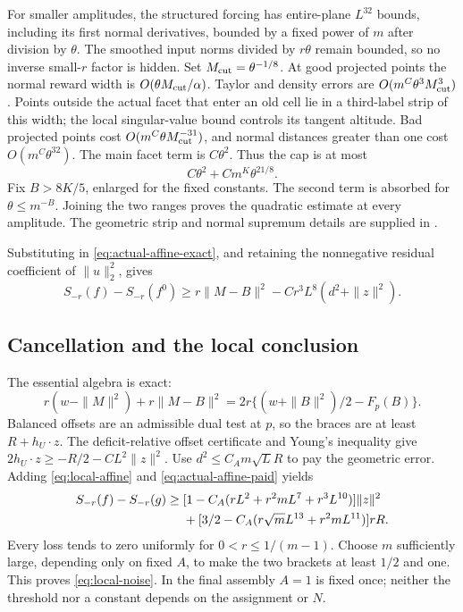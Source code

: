 For smaller amplitudes, the structured forcing has entire-plane
$L^{32}$ bounds, including its first normal derivatives, bounded by a
fixed power of $m$ after division by $\theta$. The smoothed input norms
divided by $r\theta$ remain bounded, so no inverse small-$r$ factor
is hidden. Set $M_{\rm cut}=\theta^{-1/8}$. At good projected points
the normal reward width is $O(\theta M_{\rm cut}/\alpha)$.
Taylor and density errors are $O(m^C\theta^3M_{\rm cut}^3)$.
Points outside the actual facet that enter an old cell lie in a
third-label strip of this width; the local singular-value bound controls
its tangent altitude. Bad projected points cost
$O(m^C\theta M_{\rm cut}^{-31})$, and normal distances greater than
one cost $O(m^C\theta^{32})$. The main facet term is $C\theta^2$.
Thus the cap is at most
\[
 C\theta^2+Cm^K\theta^{21/8}.
\]
Fix $B>8K/5$, enlarged for the fixed constants. The second term is
absorbed for $\theta\le m^{-B}$. Joining the two ranges proves the
quadratic estimate at every amplitude. The geometric strip and normal
supremum details are supplied in \cite{localsmallcap}.

Substituting in \eqref{eq:actual-affine-exact}, and retaining the
nonnegative residual coefficient of $\|u\|_2^2$, gives
\begin{equation}\label{eq:actual-affine-paid}
 S_{-r}(f)-S_{-r}(f^0)
       \ge r\|M-B\|^2-Cr^3L^8(d^2+\|z\|^2).
\end{equation}

\subsection{Cancellation and the local conclusion}
The essential algebra is exact:
\begin{equation}\label{eq:retained-square-cancellation}
 r(w-\|M\|^2)+r\|M-B\|^2
      =2r\{(w+\|B\|^2)/2-F_p(B)\}.
\end{equation}
Balanced offsets are an admissible dual test at $p$, so the braces
are at least $R+h_U\cdot z$. The deficit-relative offset certificate
and Young's inequality give
$2h_U\cdot z\ge-R/2-CL^2\|z\|^2$.
Use $d^2\le C_Am\sqrt L R$ to pay the geometric error. Adding
\eqref{eq:local-affine} and \eqref{eq:actual-affine-paid} yields
\begin{align}
 S_{-r}(f)-S_{-r}(g)
 \ge{}&[1-C_A(rL^2+r^2mL^7+r^3L^{10})]\|z\|^2\notag\\
 &+[3/2-C_A(r\sqrt mL^{13}+r^2mL^{11})]rR.
 \label{eq:local-final-brackets}
\end{align}
Every loss tends to zero uniformly for $0<r\le1/(m-1)$.
Choose $m$ sufficiently large, depending only on fixed $A$, to make
the two brackets at least $1/2$ and one. This proves
\eqref{eq:local-noise}. In the final assembly $A=1$ is fixed once;
neither the threshold nor a constant depends on the assignment or $N$.
